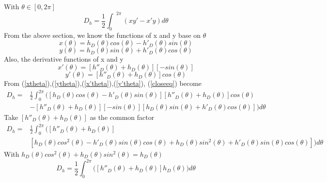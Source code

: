 \documentclass[a4paper]{article}
\begin{document}
With $\theta \in \left[0,2\pi\right] $
\begin{equation}\label{closeeq}
    D_h = \frac{1}{2} {\int_0}^{2\pi} (xy' - x'y) d\theta
\end{equation}
From the above section, we know the functions of x and y base on $\theta$
\begin{equation}\label{xtheta}
    x(\theta) = h_D(\theta)cos(\theta) - h'_D(\theta)sin(\theta)
\end{equation}
\begin{equation}\label{ytheta}
    y(\theta) = h_D(\theta)sin(\theta) + h'_D(\theta)cos(\theta)
\end{equation}
Also, the derivative functions of x and y
\begin{equation}\label{x'theta}
    x'(\theta) = \left[ h''_D(\theta) + h_D(\theta)\right]\left[-sin(\theta)\right] 
\end{equation}
\begin{equation}\label{y'theta}
    y'(\theta) = \left[ h''_D(\theta) + h_D(\theta)\right]cos(\theta) 
\end{equation}
From (\ref{xtheta}),(\ref{ytheta}),(\ref{x'theta}),(\ref{y'theta}), (\ref{closeeq}) become
\begin{equation*}
    \begin{aligned}
    D_h ={} & \frac{1}{2} \int_0^{2\pi} \big(\left[h_D(\theta)cos(\theta) - h'_D(\theta)sin(\theta)\right]\left[ h''_D(\theta) + h_D(\theta)\right]cos(\theta) \\
          & - \left[ h''_D(\theta) + h_D(\theta)\right]\left[-sin(\theta)\right] \left[h_D(\theta)sin(\theta) + h'_D(\theta)cos(\theta)\right]\big)  d\theta
    \end{aligned}
\end{equation*}
Take $\left[ h''_D(\theta) + h_D(\theta)\right]$ as the common factor
\begin{equation*}
    \begin{aligned}
    D_h ={} & \frac{1}{2} \int_0^{2\pi} \big(\left[ h''_D(\theta) + h_D(\theta)\right]\\ 
            & \left[h_D(\theta)cos^2(\theta) - h'_D(\theta)sin(\theta)cos(\theta) + h_D(\theta)sin^2(\theta) + h'_D(\theta)sin(\theta)cos(\theta)\right]\big)d\theta
    \end{aligned}
\end{equation*}
With $h_D(\theta)cos^2(\theta) + h_D(\theta)sin^2(\theta) = h_D(\theta)$
\begin{equation*}
    D_h = \frac{1}{2} \int_0^{2\pi} \big( \left[ h''_D(\theta) + h_D(\theta)\right] h_D(\theta)\big)d\theta
\end{equation*}
\end{document}
